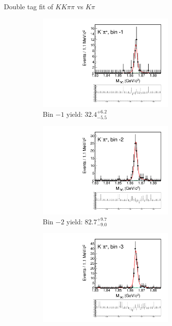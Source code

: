 \documentclass{beamer}
\begin{document}
\begin{frame}{Double tag fit of $KK\pi\pi$ vs $K\pi$}
  \begin{figure}
    \centering
    \begin{subfigure}{0.5\textwidth}
      \centering
      \includegraphics[width=0.75\textwidth,trim={0 5cm 0 0},clip=true]{Plots/DoubleTagYield_DoubleTag_Flavour_KKpipi_vs_Kpi_SignalBinM1_TagBin0.pdf}
      \caption{Bin $-1$ yield: $32.4_{-5.5}^{+6.2}$}
    \end{subfigure}%
    \begin{subfigure}{0.5\textwidth}
      \centering
      \includegraphics[width=0.75\textwidth,trim={0 5cm 0 0},clip=true]{Plots/DoubleTagYield_DoubleTag_Flavour_KKpipi_vs_Kpi_SignalBinM2_TagBin0.pdf}
      \caption{Bin $-2$ yield: $82.7_{-9.0}^{+9.7}$}
    \end{subfigure}
    \begin{subfigure}{0.5\textwidth}
      \centering
      \includegraphics[width=0.75\textwidth,trim={0 5cm 0 0},clip=true]{Plots/DoubleTagYield_DoubleTag_Flavour_KKpipi_vs_Kpi_SignalBinM3_TagBin0.pdf}

\end{subfigure}
\end{figure}
\end{frame}
\end{document}
